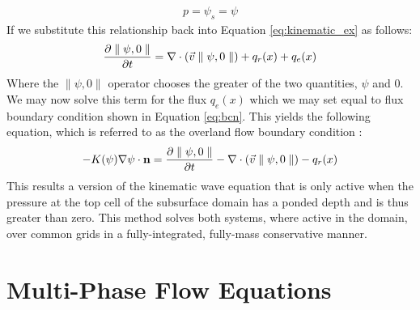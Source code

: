 \begin{eqnarray}
p = \psi_s = \psi
\label{eq:press_cont}
\end{eqnarray}
If we substitute this relationship back into Equation \ref{eq:kinematic_ex} as follows:
\begin{eqnarray}
\frac{\partial \parallel\psi,0\parallel}{\partial t} =
\nabla \cdot ({\vec v} \parallel\psi,0\parallel) + q_r(x) + q_e(x)
\label{eq:OF_BC_ex}
\end{eqnarray}
Where the $\parallel\psi,0\parallel$ operator chooses the greater of the two quantities, $\psi$ and $0$.  We may now solve this term for the flux $q_e(x)$ which we may set equal to flux boundary condition shown in Equation \ref{eq:bcn}.  This yields the following equation, which is referred to as the overland flow boundary condition \cite{KM06}:
\begin{eqnarray}
-K(\psi)\nabla \psi \cdot {\bf n}  = \frac{\partial \parallel\psi,0\parallel}{\partial t} -
\nabla \cdot ({\vec v} \parallel\psi,0\parallel) - q_r(x)
\label{eq:overland_bc}
\end{eqnarray}
This results a version of the kinematic wave equation that is only active when the pressure at the top cell of the subsurface domain has a ponded depth and is thus greater than zero.  This method solves both systems, where active in the domain, over common grids in a fully-integrated, fully-mass conservative manner.

\section{Multi-Phase Flow Equations}
\label{Multi-Phase Flow Equations}

